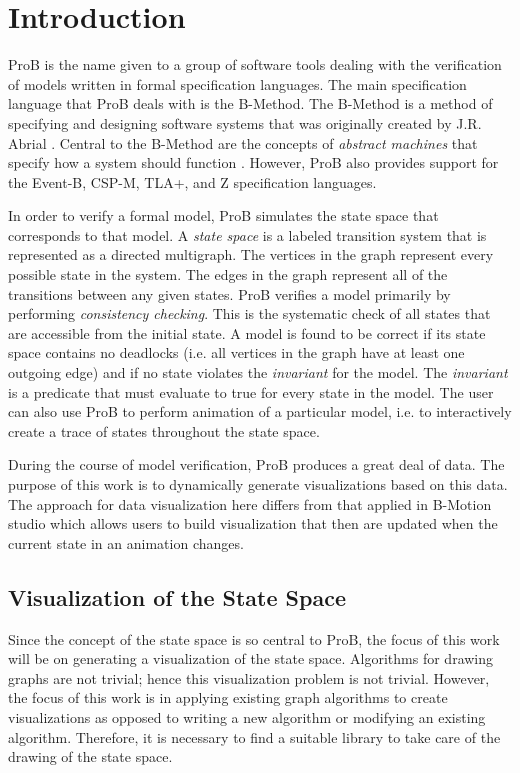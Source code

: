 \section{Introduction}

ProB is the name given to a group of software tools dealing with the verification of models written in formal specification languages. The main specification language that ProB deals with is the B-Method. The B-Method is a method of specifying and designing software systems that was originally created by J.R. Abrial \cite{abrial2005b}. Central to the B-Method are the concepts of \emph{abstract machines} that specify how a system should function \cite{schneider2001b}. However, ProB also provides support for the Event-B, CSP-M, TLA+, and Z specification languages. 

In order to verify a formal model, ProB simulates the state space that corresponds to that model. A \emph{state space} is a labeled transition system that is represented as a directed multigraph. The vertices in the graph represent every possible state in the system. The edges in the graph represent all of the transitions between any given states. ProB verifies a model primarily by performing \emph{consistency checking}. This is the systematic check of all states that are accessible from the initial state. A model is found to be correct if its state space contains no deadlocks (i.e. all vertices in the graph have at least one outgoing edge) and if no state violates the \emph{invariant} for the model. The \emph{invariant} is a predicate that must evaluate to true for every state in the model. The user can also use ProB to perform animation of a particular model, i.e. to interactively create a trace of states throughout the state space.

During the course of model verification, ProB produces a great deal of data. The purpose of this work is to dynamically generate visualizations based on this data. The approach for data visualization here differs from that applied in B-Motion studio \cite{LaBeLe09_258} which allows users to build visualization that then are updated when the current state in an animation changes.

\subsection{Visualization of the State Space}

Since the concept of the state space is so central to ProB, the focus of this work will be on generating a visualization of the state space. Algorithms for drawing graphs are not trivial; hence this visualization problem is not trivial. However, the focus of this work is in applying existing graph algorithms to create visualizations as opposed to writing a new algorithm or modifying an existing algorithm. Therefore, it is necessary to find a suitable library to take care of the drawing of the state space.

